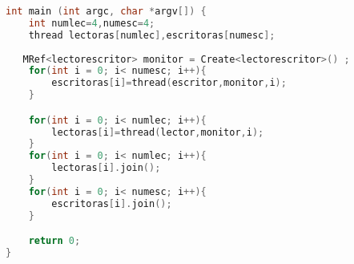 \documentclass{article}
\begin{document}
\begin{lstlisting}[language=C++,caption=función main lectores ] 
int main (int argc, char *argv[]) {
	int numlec=4,numesc=4;
	thread lectoras[numlec],escritoras[numesc];
	
   MRef<lectorescritor> monitor = Create<lectorescritor>() ;	
	for(int i = 0; i< numesc; i++){
		escritoras[i]=thread(escritor,monitor,i);
	}	

	for(int i = 0; i< numlec; i++){
		lectoras[i]=thread(lector,monitor,i);
	}
	for(int i = 0; i< numlec; i++){
		lectoras[i].join();
	}
	for(int i = 0; i< numesc; i++){
		escritoras[i].join();
	}

	return 0;
}
\end{lstlisting}
\end{document}

